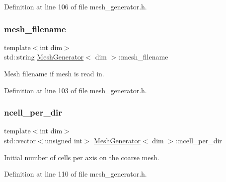 Definition at line 106 of file mesh\+\_\+generator.\+h.

\mbox{\label{class_mesh_generator_a1b283d2ba59b1719cab8dd191e72508a}} 
\subsubsection{\texorpdfstring{mesh\+\_\+filename}{mesh\_filename}}
{\footnotesize\ttfamily template$<$int dim$>$ \\
std\+::string \hyperlink{class_mesh_generator}{Mesh\+Generator}$<$ dim $>$\+::mesh\+\_\+filename\hspace{0.3cm}{\ttfamily [private]}}



Mesh filename if mesh is read in. 



Definition at line 103 of file mesh\+\_\+generator.\+h.

\mbox{\label{class_mesh_generator_a4d73b2d6a3f66e8a696e2228dc53fb76}} 
\subsubsection{\texorpdfstring{ncell\+\_\+per\+\_\+dir}{ncell\_per\_dir}}
{\footnotesize\ttfamily template$<$int dim$>$ \\
std\+::vector$<$unsigned int$>$ \hyperlink{class_mesh_generator}{Mesh\+Generator}$<$ dim $>$\+::ncell\+\_\+per\+\_\+dir\hspace{0.3cm}{\ttfamily [private]}}



Initial number of cells per axis on the coarse mesh. 



Definition at line 110 of file mesh\+\_\+generator.\+h.

\mbox{\label{class_mesh_generator_a4d3e0a3f830a2fa4d35d7f269fba3b02}} 
